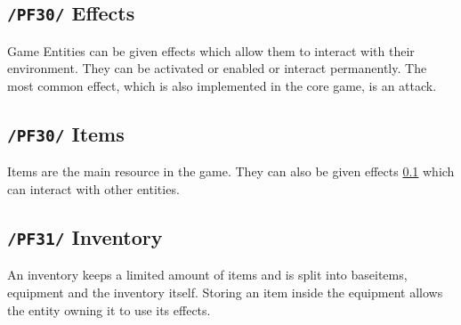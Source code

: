 \documentclass[11pt]{article}
\begin{document}
\subsection{\texttt{/PF30/} Effects}\label{subsec:pf30effects}
Game Entities can be given effects which allow them to interact with their environment.
They can be activated or enabled or interact permanently.
The most common effect, which is also implemented in the core game, is an attack.
\subsection{\texttt{/PF30/} Items}\label{subsec:pf40items}
Items are the main resource in the game. They can also be given effects \ref{subsec:pf30effects} which can interact with other entities.
\subsection{\texttt{/PF31/} Inventory}\label{subsec:pf41inventory}
An inventory keeps a limited amount of items and is split into baseitems, equipment and the inventory itself.
Storing an item inside the equipment allows the entity owning it to use its effects.
\end{document}
